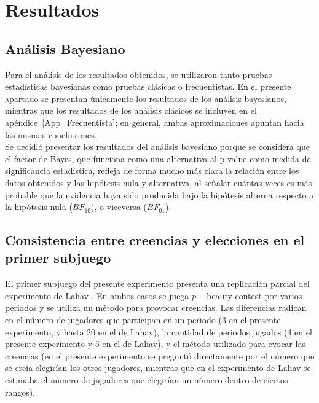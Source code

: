 
\chapter{Resultados} %
\label{Cap_Res} %

\section{Análisis Bayesiano}

Para el análisis de los resultados obtenidos, se utilizaron tanto pruebas estadísticas bayesianas como pruebas clásicas o frecuentistas. En el presente apartado se presentan únicamente los resultados de los análisis bayesianos, mientras que los resultados de los análisis clásicos se incluyen en el apéndice~\ref{App_Frecuentista}; en general, ambas aproximaciones apuntan hacia las mismas conclusiones.\\

Se decidió presentar los resultados del análisis bayesiano porque se considera que el factor de Bayes, que funciona como una alternativa al p-value como medida de significancia estadística, refleja de forma mucho más clara la  relación entre los datos obtenidos y las hipótesis nula y alternativa, al señalar cuántas veces es más probable que la evidencia haya sido producida bajo la hipótesis alterna respecto a la hipótesis nula ($BF_{10}$), o viceversa ($BF_{01}$).\\

\section{Consistencia entre creencias y elecciones en el primer subjuego}

El primer subjuego del presente experimento presenta una replicación parcial del experimento de Lahav \parencite*{Lahav2015}. En ambos casos se juega $p-$beauty contest por varios periodos y se utiliza un método para provocar creencias. Las diferencias radican en el número de jugadores que participan en un periodo (3 en el presente experimento, y hasta 20 en el de Lahav), la cantidad de periodos jugados (4 en el presente experimento y 5 en el de Lahav), y el método utilizado para evocar las creencias (en el presente experimento se preguntó directamente por el número que se creía elegirían los otros jugadores, mientras que en el experimento de Lahav se estimaba el número de jugadores que elegirían un número dentro de ciertos rangos).\\

